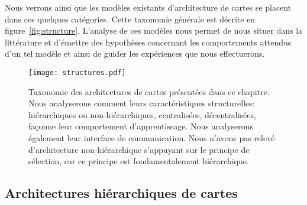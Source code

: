 \documentclass[../main]{subfiles}
\begin{document}
Nous verrons ainsi que les modèles existants d'architecture de cartes se placent dans ces quelques catégories. Cette taxonomie générale est décrite en figure~\ref{fig:structure}.
L'analyse de ces modèles nous permet de nous situer dans la littérature et d'émettre des hypothèses concernant les comportements attendus d'un tel modèle et ainsi de guider les expériences que nous effectuerons.


\begin{figure}
\centering\texttt{[image: structures.pdf]}
\caption{Taxonomie des architectures de cartes présentées dans ce chapitre. Nous analyserons comment leurs caractéristiques structurelles: hiérarchiques ou non-hiérarchiques, centralisées, décentralisées, façonne leur comportement d'apprentissage. Nous analyserons également leur interface de communication. Nous n'avons pas relevé d'architecture non-hiérarchique s'appuyant sur le principe de sélection, car ce principe est fondamentalement hiérarchique. \label{fig:taxo}}
\end{figure}



\subsection{Architectures hiérarchiques de cartes}
\end{document}
